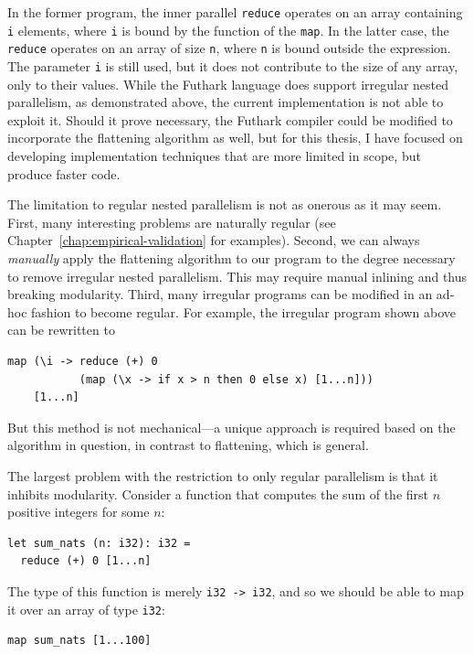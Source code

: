 In the former program, the inner parallel \lstinline{reduce} operates
on an array containing \lstinline{i} elements, where \lstinline{i} is
bound by the function of the \lstinline{map}.  In the latter case, the
\lstinline{reduce} operates on an array of size \lstinline{n}, where
\lstinline{n} is bound outside the expression.  The parameter
\lstinline{i} is still used, but it does not contribute to the size of
any array, only to their values.  While the Futhark language does
support irregular nested parallelism, as demonstrated above, the
current implementation is not able to exploit it.  Should it prove
necessary, the Futhark compiler could be modified to incorporate the
flattening algorithm as well, but for this thesis, I have focused on
developing implementation techniques that are more limited in scope,
but produce faster code.

The limitation to regular nested parallelism is not as onerous as it
may seem.  First, many interesting problems are naturally regular (see
Chapter~\ref{chap:empirical-validation} for examples).  Second, we can
always \textit{manually} apply the flattening algorithm to our program
to the degree necessary to remove irregular nested parallelism.  This
may require manual inlining and thus breaking modularity.  Third, many
irregular programs can be modified in an ad-hoc fashion to become
regular.  For example, the irregular program shown above can be
rewritten to

\begin{lstlisting}
map (\i -> reduce (+) 0
           (map (\x -> if x > n then 0 else x) [1...n]))
    [1...n]
\end{lstlisting}

But this method is not mechanical---a unique approach is required
based on the algorithm in question, in contrast to flattening, which
is general.

The largest problem with the restriction to only regular parallelism
is that it inhibits modularity.  Consider a function that computes the
sum of the first $n$ positive integers for some $n$:

\begin{lstlisting}
let sum_nats (n: i32): i32 =
  reduce (+) 0 [1...n]
\end{lstlisting}

The type of this function is merely \lstinline{i32 -> i32}, and so we
should be able to map it over an array of type \lstinline{i32}:

\begin{lstlisting}
map sum_nats [1...100]
\end{lstlisting}

